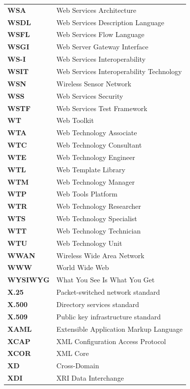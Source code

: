 \begin{longtable}{p{3cm}p{11cm}}
\textbf{WSA} & Web Services Architecture \\
\textbf{WSDL} & Web Services Description Language \\
\textbf{WSFL} & Web Services Flow Language \\
\textbf{WSGI} & Web Server Gateway Interface \\
\textbf{WS-I} & Web Services Interoperability \\
\textbf{WSIT} & Web Services Interoperability Technology \\
\textbf{WSN} & Wireless Sensor Network \\
\textbf{WSS} & Web Services Security \\
\textbf{WSTF} & Web Services Test Framework \\
\textbf{WT} & Web Toolkit \\
\textbf{WTA} & Web Technology Associate \\
\textbf{WTC} & Web Technology Consultant \\
\textbf{WTE} & Web Technology Engineer \\
\textbf{WTL} & Web Template Library \\
\textbf{WTM} & Web Technology Manager \\
\textbf{WTP} & Web Tools Platform \\
\textbf{WTR} & Web Technology Researcher \\
\textbf{WTS} & Web Technology Specialist \\
\textbf{WTT} & Web Technology Technician \\
\textbf{WTU} & Web Technology Unit \\
\textbf{WWAN} & Wireless Wide Area Network \\
\textbf{WWW} & World Wide Web \\
\textbf{WYSIWYG} & What You See Is What You Get \\
\textbf{X.25} & Packet-switched network standard \\
\textbf{X.500} & Directory services standard \\
\textbf{X.509} & Public key infrastructure standard \\
\textbf{XAML} & Extensible Application Markup Language \\
\textbf{XCAP} & XML Configuration Access Protocol \\
\textbf{XCOR} & XML Core \\
\textbf{XD} & Cross-Domain \\
\textbf{XDI} & XRI Data Interchange \\

\end{longtable}

